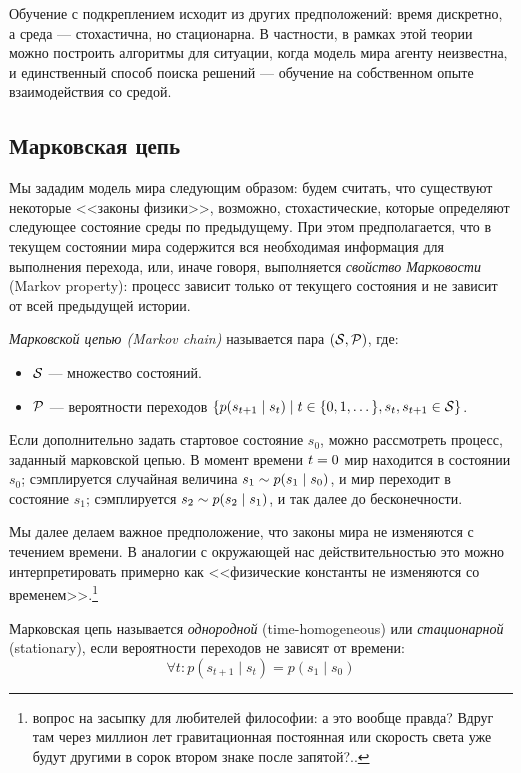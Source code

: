 Обучение с подкреплением исходит из других предположений: время дискретно, а среда --- стохастична, но стационарна. В частности, в рамках этой теории можно построить алгоритмы для ситуации, когда модель мира агенту неизвестна, и единственный способ поиска решений --- обучение на собственном опыте взаимодействия со средой.

\subsection{Марковская цепь}

Мы зададим модель мира следующим образом: будем считать, что существуют некоторые <<законы физики>>, возможно, стохастические, которые определяют следующее состояние среды по предыдущему. При этом предполагается, что в текущем состоянии мира содержится вся необходимая информация для выполнения перехода, или, иначе говоря, выполняется \emph{свойство Марковости} (Markov property): процесс зависит только от текущего состояния и не зависит от всей предыдущей истории.

\begin{definition} 
\emph{Марковской цепью (Markov chain)} называется пара $(\mathcal{S}, \mathcal{P})$, где: 
\begin{itemize}
    \item $\mathcal{S}$ --- множество состояний.
    \item $\mathcal{P}$ --- вероятности переходов $\{p(s_{t+1} \HM\mid s_t) \HM\mid t \HM\in \{0, 1, \dots \}, s_t, s_{t+1} \HM\in \St\}$.
\end{itemize}
\end{definition}

Если дополнительно задать стартовое состояние $s_0$, можно рассмотреть процесс, заданный марковской цепью. В момент времени $t \HM= 0$ мир находится в состоянии $s_0$; сэмплируется случайная величина $s_1 \HM\sim p(s_1 \HM\mid s_0)$, и мир переходит в состояние $s_1$; сэмплируется $s_2 \HM\sim p(s_2 \HM\mid s_1)$, и так далее до бесконечности.

Мы далее делаем важное предположение, что законы мира не изменяются с течением времени. В аналогии с окружающей нас действительностью это можно интерпретировать примерно как <<физические константы не изменяются со временем>>.\footnote{вопрос на засыпку для любителей философии: а это вообще правда? Вдруг там через миллион лет гравитационная постоянная или скорость света уже будут другими в сорок втором знаке после запятой?..}

\begin{definition} 
Марковская цепь называется \emph{однородной} (time-homogeneous) или \emph{стационарной} (stationary), если вероятности переходов не зависят от времени:
\begin{equation*}
\forall t \colon p(s_{t+1} \mid s_t) = p(s_1 \mid s_0)
\end{equation*}
\end{definition}

